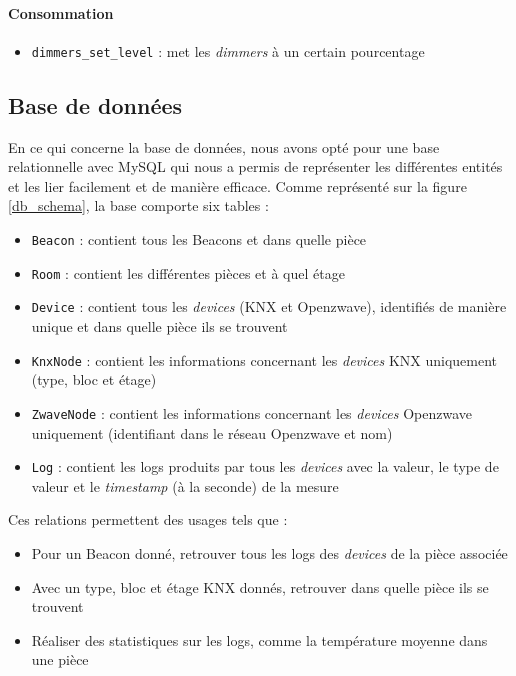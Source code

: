 \paragraph{Consommation}
\begin{itemize}
    \item \texttt{dimmers_set_level} : met les \textit{dimmers} à un certain pourcentage
\end{itemize}

\subsection{Base de données}
En ce qui concerne la base de données, nous avons opté pour une base relationnelle avec MySQL \cite{mysql} qui nous a permis de représenter les différentes entités et les lier facilement et de manière efficace. Comme représenté sur la figure \ref{db_schema}, la base comporte six tables :
\begin{itemize}
    \item \texttt{Beacon} : contient tous les Beacons et dans quelle pièce
    \item \texttt{Room} : contient les différentes pièces et à quel étage
    \item \texttt{Device} : contient tous les \textit{devices} (KNX et Openzwave), identifiés de manière unique et dans quelle pièce ils se trouvent
    \item \texttt{KnxNode} : contient les informations concernant les \textit{devices} KNX uniquement (type, bloc et étage)
    \item \texttt{ZwaveNode} : contient les informations concernant les \textit{devices} Openzwave uniquement (identifiant dans le réseau Openzwave et nom)
    \item \texttt{Log} : contient les logs produits par tous les \textit{devices} avec la valeur, le type de valeur et le \textit{timestamp} (à la seconde) de la mesure
\end{itemize}
Ces relations permettent des usages tels que :
\begin{itemize}
    \item Pour un Beacon donné, retrouver tous les logs des \textit{devices} de la pièce associée
    \item Avec un type, bloc et étage KNX donnés, retrouver dans quelle pièce ils se trouvent
    \item Réaliser des statistiques sur les logs, comme la température moyenne dans une pièce
\end{itemize}

